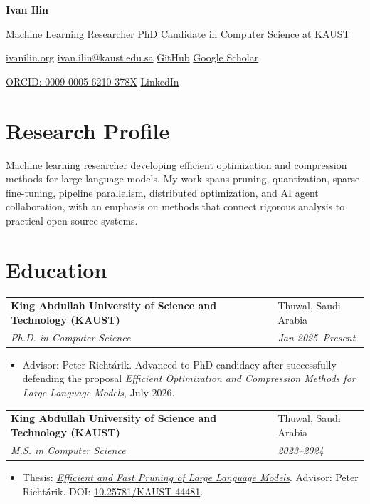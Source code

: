 \documentclass[10pt,letterpaper]{article}
\makeatletter
\newcommand{\contactsep}{\hspace{0.55em}\textcolor{Muted}{\textbar}\hspace{0.55em}}
\newcommand{\cventry}[4]{%
  \begin{tabularx}{\textwidth}{@{}>{\raggedright\arraybackslash}X>{\raggedleft\arraybackslash}p{1.52in}@{}}
    \textbf{#1} & \textcolor{Muted}{#2} \\
    \textit{#3} & \textit{\textcolor{Muted}{#4}}
  \end{tabularx}\vspace{0.12em}
}
\newenvironment{cvitems}{%
  \begin{itemize}[
    leftmargin=1.18em,
    label=\textcolor{Accent}{\raisebox{0.15ex}{\scriptsize$\bullet$}},
    itemsep=0.12em,
    topsep=0.12em,
    parsep=0pt,
    partopsep=0pt
  ]\small
}{%
  \end{itemize}\vspace{0.28em}
}
\makeatother
\begin{document}
\begin{center}
  {\fontsize{24}{27}\selectfont\bfseries\color{Accent} Ivan Ilin}\par
  \vspace{0.16em}
  {\large Machine Learning Researcher \textcolor{Muted}{\textbar} PhD Candidate in Computer Science at KAUST}\par
  \vspace{0.42em}
  {\small
    \href{https://ivanilin.org/}{ivanilin.org}\contactsep
    \href{mailto:ivan.ilin@kaust.edu.sa}{ivan.ilin@kaust.edu.sa}\contactsep
    \href{https://github.com/vectozavr}{GitHub}\contactsep
    \href{https://scholar.google.com/citations?user=elw14gUAAAAJ}{Google Scholar}
    \par
    \vspace{0.16em}
    \href{https://orcid.org/0009-0005-6210-378X}{ORCID: 0009-0005-6210-378X}\contactsep
    \href{https://www.linkedin.com/in/ivan-ilin-452045307/}{LinkedIn}
  }
\end{center}

\vspace{-0.35em}
\section{Research Profile}
Machine learning researcher developing efficient optimization and compression methods for large language models. My work spans pruning, quantization, sparse fine-tuning, pipeline parallelism, distributed optimization, and AI agent collaboration, with an emphasis on methods that connect rigorous analysis to practical open-source systems.

\section{Education}

\cventry{King Abdullah University of Science and Technology (KAUST)}{Thuwal, Saudi Arabia}{Ph.D. in Computer Science}{Jan 2025--Present}
\begin{cvitems}
  \item Advisor: Peter Richt\'arik. Advanced to PhD candidacy after successfully defending the proposal \textit{Efficient Optimization and Compression Methods for Large Language Models}, July 2026.
\end{cvitems}

\cventry{King Abdullah University of Science and Technology (KAUST)}{Thuwal, Saudi Arabia}{M.S. in Computer Science}{2023--2024}
\begin{cvitems}
  \item Thesis: \href{https://repository.kaust.edu.sa/items/2b0d935b-4ce3-4cf7-aab3-e5b3352fa515}{\textit{Efficient and Fast Pruning of Large Language Models}}. Advisor: Peter Richt\'arik. DOI: \href{https://doi.org/10.25781/KAUST-44481}{10.25781/KAUST-44481}.
\end{cvitems}
\end{document}
